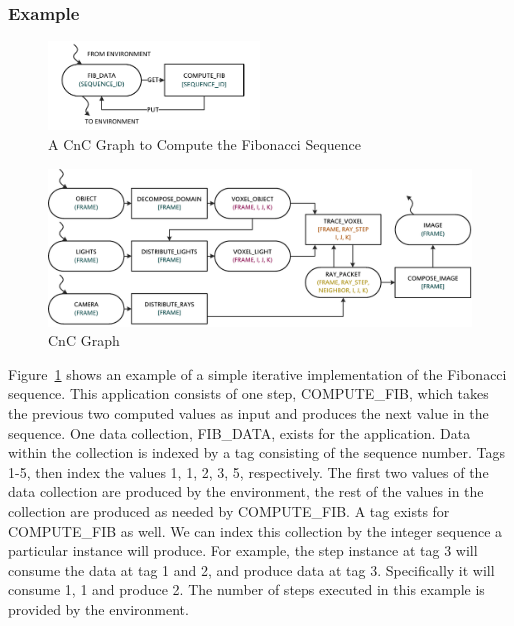 \subsubsection{Example}

\begin{figure}[!tb]
  \centering
  \includegraphics[width=0.5\textwidth]{drawings/FibExample.pdf}
  \caption{A CnC Graph to Compute the Fibonacci Sequence}
  \label{fig:fib_graph}
\end{figure}

\begin{figure}[t]
  \centering
  \includegraphics[width=\textwidth]{drawings/CnC.pdf}
  \caption{CnC Graph}
  \label{fig:cnc}
\end{figure}

Figure~\ref{fig:fib_graph} shows an example of a
simple iterative implementation of the Fibonacci sequence. This
application consists of one step, COMPUTE\_FIB, which takes the
previous two computed values as input and produces the next value in
the sequence. One data collection, FIB\_DATA, exists for the
application. Data within the collection is indexed by a tag consisting
of the sequence number. Tags 1-5, then index the values 1,
1, 2, 3, 5, respectively. The first two values of the data collection
are produced by the environment, the rest of the values in the
collection are produced as needed by COMPUTE\_FIB. A tag exists for
COMPUTE\_FIB as well. We can index this collection by the integer
sequence a particular instance will produce. For example, the step
instance at tag 3 will consume the data at tag 1 and 2, and produce
data at tag 3. Specifically it will consume 1, 1 and produce 2.
The number of steps executed in this example is provided by the 
environment.

